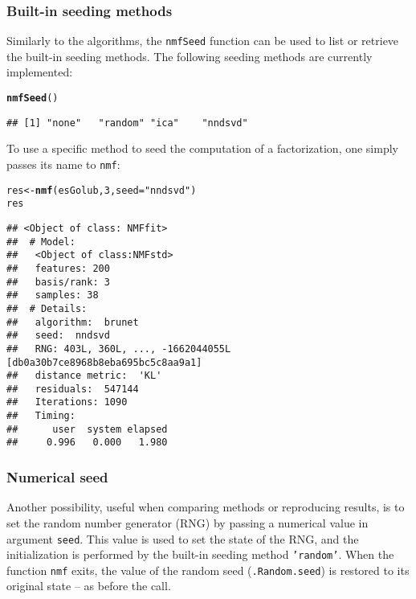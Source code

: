 \documentclass[a4paper]{article}\usepackage{graphicx, color}
\makeatletter
\newcommand{\hlfunctioncall}[1]{\textcolor[rgb]{0.501960784313725,0,0.329411764705882}{\textbf{#1}}}%
\newcommand{\hlstring}[1]{\textcolor[rgb]{0.6,0.6,1}{#1}}%
\newenvironment{kframe}{%
 \def\at@end@of@kframe{}%
 \ifinner\ifhmode%
  \def\at@end@of@kframe{\end{minipage}}%
  \begin{minipage}{\columnwidth}%
 \fi\fi%
 \def\FrameCommand##1{\hskip\@totalleftmargin \hskip-\fboxsep
 \colorbox{shadecolor}{##1}\hskip-\fboxsep
     \hskip-\linewidth \hskip-\@totalleftmargin \hskip\columnwidth}%
 \MakeFramed {\advance\hsize-\width
   \@totalleftmargin\z@ \linewidth\hsize
   \@setminipage}}%
 {\par\unskip\endMakeFramed%
 \at@end@of@kframe}
\newenvironment{knitrout}{}{} %
\let\code=\texttt
\makeatother
\begin{document}
\subsubsection{Built-in seeding methods}
Similarly to the algorithms, the \code{nmfSeed} function can be used to list or retrieve the built-in seeding methods.
The following seeding methods are currently implemented:

\begin{knitrout}
\color{fgcolor}\begin{kframe}
\begin{alltt}
\hlfunctioncall{nmfSeed}()
\end{alltt}
\begin{verbatim}
## [1] "none"   "random" "ica"    "nndsvd"
\end{verbatim}
\end{kframe}
\end{knitrout}


To use a specific method to seed the computation of a factorization, one simply passes its name to \code{nmf}:

\begin{knitrout}
\color{fgcolor}\begin{kframe}
\begin{alltt}
res <- \hlfunctioncall{nmf}(esGolub, 3, seed = \hlstring{"nndsvd"})
res
\end{alltt}
\begin{verbatim}
## <Object of class: NMFfit>
##  # Model:
##   <Object of class:NMFstd>
##   features: 200 
##   basis/rank: 3 
##   samples: 38 
##  # Details:
##   algorithm:  brunet 
##   seed:  nndsvd 
##   RNG: 403L, 360L, ..., -1662044055L [db0a30b7ce8968b8eba695bc5c8aa9a1]
##   distance metric:  'KL' 
##   residuals:  547144 
##   Iterations: 1090 
##   Timing:
##      user  system elapsed 
##     0.996   0.000   1.980
\end{verbatim}
\end{kframe}
\end{knitrout}


\subsubsection{Numerical seed}\label{sec:numseed}
Another possibility, useful when comparing methods or reproducing results, is to set the random number generator (RNG) by passing a numerical value in argument \code{seed}.
This value is used to set the state of the RNG, and the initialization is performed by the built-in seeding method \code{'random'}.
When the function \code{nmf} exits, the value of the random seed (\code{.Random.seed}) is restored to its original state -- as before the call.
\end{document}
